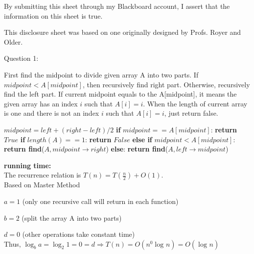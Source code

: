 \documentclass[12pt]{article}
\begin{document}
\vspace*{40ex}

By submitting this sheet through my Blackboard account, I assert that the information on this sheet is true.


\hfill {\tiny This disclosure sheet was based on one originally designed
  by
  Profs. Royer and Older.}


\pagebreak
\noindent
\large Question 1: \vspace{5mm} \par
\normalsize 
First find the midpoint to divide given array A into two parts. If $midpoint < A[midpoint]$, then recursively find right part. Otherwise, recursively find the left part.
If current midpoint equals to the A[midpoint], it means the given array has an index $i$ such that $A[i] = i$. 
When the length of current array is one and there is not an index $i$ such that $A[i] = i$, just return false.


\begin{algorithm}
\begin{algorithmic}
  \State \textbf{}$midpoint = left + (right - left) / 2$
  \State \textbf{if} $midpoint == A[midpoint]$:
  \State \hspace{0.8cm}  \textbf{return} $True$
  \State \textbf{if} $length(A) == 1$:
  \State \hspace{0.8cm}  \textbf{return} $False$
  \State \textbf{else if} $midpoint < A[midpoint]$:
  \State \hspace{0.8cm}  \textbf{return find}($A, midpoint \rightarrow right$)
  \State \textbf{else}:
  \State \hspace{0.8cm} \textbf{return find}($A, left \rightarrow midpoint$)
\EndFunction
\end{algorithmic}
\end{algorithm}

\textbf{running time:} \\
The recurrence relation is $T(n) = T(\frac{n}{2}) + O(1)$.\\
Based on Master Method \par
$a = 1$  (only one recursive call will return in each function) \par
$b = 2$  (split the array A into two parts) \par
$d = 0$ (other operations take constant time)\\ 
Thus, $\log_{b}{a} = \log_{2}{1} = 0 = d \Rightarrow T(n) = O({n^0}{\log_{}{n}}) = O(\log_{}{n})$  
\end{document}
